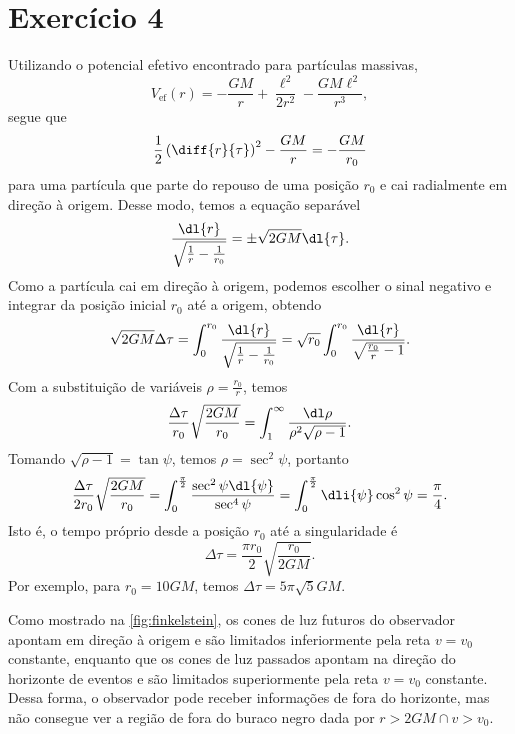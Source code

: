 \section*{Exercício 4}
Utilizando o potencial efetivo encontrado para partículas massivas,
\begin{equation*}
    V_\mathrm{ef}(r) = - \frac{GM}{r} + \frac{\ell^2}{2r^2} - \frac{GM\ell^2}{r^3},
\end{equation*}
segue que
\begin{equation*}
    \frac12\left(\diff{r}{\tau}\right)^2 - \frac{GM}{r} = - \frac{GM}{r_0}
\end{equation*}
para uma partícula que parte do repouso de uma posição \(r_0\) e cai radialmente em direção à origem. Desse modo, temos a equação separável
\begin{equation*}
    \frac{\dl{r}}{\sqrt{\frac1r - \frac1{r_0}}} = \pm\sqrt{2GM} \dl{\tau}.
\end{equation*}
Como a partícula cai em direção à origem, podemos escolher o sinal negativo e integrar da posição inicial \(r_0\) até a origem, obtendo
\begin{equation*}
    \sqrt{2GM} \Delta\tau = \int_{0}^{r_0} \frac{\dl{r}}{\sqrt{\frac1r - \frac1{r_0}}} = \sqrt{r_0} \int_{0}^{r_0} \frac{\dl{r}}{\sqrt{\frac{r_0}{r} - 1}}.
\end{equation*}
Com a substituição de variáveis \(\rho = \frac{r_0}{r}\), temos
\begin{equation*}
    \frac{\Delta\tau}{r_0}\sqrt{\frac{2GM}{r_0}} = \int_1^\infty\frac{\dl\rho}{\rho^2\sqrt{\rho - 1}}.
\end{equation*}
Tomando \(\sqrt{\rho - 1} = \tan\psi\), temos \(\rho = \sec^2\psi\), portanto
\begin{equation*}
    \frac{\Delta\tau}{2r_0}\sqrt{\frac{2GM}{r_0}} = \int_{0}^\frac\pi2 \frac{\sec^2\psi\dl{\psi}}{\sec^4\psi} = \int_{0}^{\frac\pi2} \dli{\psi}\cos^2\psi = \frac{\pi}{4}.
\end{equation*}
Isto é, o tempo próprio desde a posição \(r_0\) até a singularidade é
\begin{equation*}
    \Delta \tau = \frac{\pi r_0}{2}\sqrt{\frac{r_0}{2GM}}.
\end{equation*}
Por exemplo, para \(r_0 = 10GM\), temos \(\Delta\tau = 5\pi\sqrt{5}GM\).

Como mostrado na \cref{fig:finkelstein}, os cones de luz futuros do observador apontam em direção à origem e são limitados inferiormente pela reta \(v = v_0\) constante, enquanto que os cones de luz passados apontam na direção do horizonte de eventos e são limitados superiormente pela reta \(v = v_0\) constante. Dessa forma, o observador pode receber informações de fora do horizonte, mas não consegue ver a região de fora do buraco negro dada por \(r > 2GM \cap v > v_0\).
